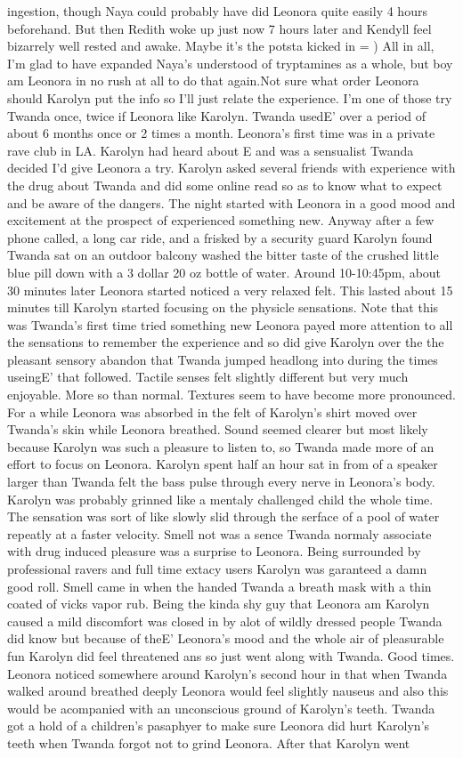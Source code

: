 \documentclass[12pt]{book}
\begin{document}
ingestion, though Naya could probably have did Leonora quite easily 4 hours beforehand. But then Redith woke up just now 7 hours later and Kendyll feel bizarrely well rested and awake. Maybe it's the potsta kicked in = ) All in all, I'm glad to have expanded Naya's understood of tryptamines as a whole, but boy am Leonora in no rush at all to do that again.Not sure what order Leonora should Karolyn put the info so I'll just relate the experience. I'm one of those try Twanda once, twice if Leonora like Karolyn. Twanda usedE' over a period of about 6 months once or 2 times a month. Leonora's first time was in a private rave club in LA. Karolyn had heard about E and was a sensualist Twanda decided I'd give Leonora a try. Karolyn asked several friends with experience with the drug about Twanda and did some online read so as to know what to expect and be aware of the dangers. The night started with Leonora in a good mood and excitement at the prospect of experienced something new. Anyway after a few phone called, a long car ride, and a frisked by a security guard Karolyn found Twanda sat on an outdoor balcony washed the bitter taste of the crushed little blue pill down with a 3 dollar 20 oz bottle of water. Around 10-10:45pm, about 30 minutes later Leonora started noticed a very relaxed felt. This lasted about 15 minutes till Karolyn started focusing on the physicle sensations. Note that this was Twanda's first time tried something new Leonora payed more attention to all the sensations to remember the experience and so did give Karolyn over the the pleasant sensory abandon that Twanda jumped headlong into during the times useingE' that followed. Tactile senses felt slightly different but very much enjoyable. More so than normal. Textures seem to have become more pronounced. For a while Leonora was absorbed in the felt of Karolyn's shirt moved over Twanda's skin while Leonora breathed. Sound seemed clearer but most likely because Karolyn was such a pleasure to listen to, so Twanda made more of an effort to focus on Leonora. Karolyn spent half an hour sat in from of a speaker larger than Twanda felt the bass pulse through every nerve in Leonora's body. Karolyn was probably grinned like a mentaly challenged child the whole time. The sensation was sort of like slowly slid through the serface of a pool of water repeatly at a faster velocity. Smell not was a sence Twanda normaly associate with drug induced pleasure was a surprise to Leonora. Being surrounded by professional ravers and full time extacy users Karolyn was garanteed a damn good roll. Smell came in when the handed Twanda a breath mask with a thin coated of vicks vapor rub. Being the kinda shy guy that Leonora am Karolyn caused a mild discomfort was closed in by alot of wildly dressed people Twanda did know but because of theE' Leonora's mood and the whole air of pleasurable fun Karolyn did feel threatened ans so just went along with Twanda. Good times. Leonora noticed somewhere around Karolyn's second hour in that when Twanda walked around breathed deeply Leonora would feel slightly nauseus and also this would be acompanied with an unconscious ground of Karolyn's teeth. Twanda got a hold of a children's pasaphyer to make sure Leonora did hurt Karolyn's teeth when Twanda forgot not to grind Leonora. After that Karolyn went 
\end{document}
